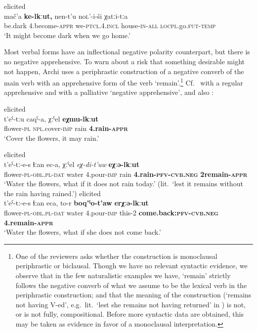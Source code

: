 \documentclass[output=paper,colorlinks,citecolor=brown]{langscibook}
\begin{document}
  \begin{exe}\ex \label{ex:DD8} \textnormal{elicited}\\
{\gll mač'a \textbf{ke-lkːut,} nen-t'u no\textsc{l}'-i-ši χatːi-tːa\\
be.dark 4.become-\textsc{appr} we-\textsc{ptcl.4.incl} house-\textsc{in-all} \textsc{locpl}.go.\textsc{fut-temp}\\\glt `It might become dark when we go home.'}
\end{exe}


 Most verbal forms have an inflectional negative polarity counterpart, but there is no negative apprehensive. To warn about a risk that something desirable might not happen, Archi uses a periphrastic construction of a negative converb of the main verb with an apprehensive form of the verb `remain'.\footnote{One of the reviewers asks whether the construction is monoclausal periphrastic or biclausal. Though we have no relevant syntactic evidence, we observe that in the few naturalistic examples we have, `remain' strictly follows the negative converb of what we assume to be the lexical verb in the periphrastic construction; and that the meaning of the construction (`remains not having V-ed', e.g.\  lit.\ `lest she remains not having returned' in ) is not, or is not fully, compositional. Before more syntactic data are obtained, this may be taken as evidence in favor of a monoclausal interpretation.} Cf.\  with a regular apprehensive and  with a palliative `negative apprehensive', and also :

\ea \label{ex:DD9} \textnormal{elicited} \\
\gll t'eˁ-tːu caqˁ-a, χːˁel \textbf{eχmu-lkːut} \\
flower-\textsc{pl} \textsc{npl}.cover-\textsc{imp} rain \textbf{4.rain-\textsc{appr}} \\
\glt `Cover the flowers, it may rain.'
\z


\ea \label{ex:DD10} \textnormal{elicited} \\
\gll t'eˁ-tː-e-s ɬːan ec-a, χːˁel \textit{eχ-di-t'uw} \textbf{eχːə-lkːut} \\
flower-\textsc{pl-obl.pl-dat} water 4.pour-\textsc{imp} rain \textbf{4.rain-\textsc{pfv-cvb.neg}} \textbf{{\textlangle}2{\textrangle}remain-\textsc{appr}} \\
\glt `Water the flowers, what if it does not rain today.' (lit.\ `lest it remains without the rain having rained.')
\z
\ea \label{ex:DD11} \textnormal{elicited} \\
\gll t'eˁ-tː-e-s ɬːan eca, to-r \textbf{boq'ˁo-t'aw} \textbf{e{\textlangle}r{\textrangle}χːə-lkːut}\\
flower-\textsc{pl-obl.pl-dat} water 4.pour-\textsc{imp} this-2 \textbf{come.back:\textsc{pfv-cvb.neg}} \textbf{4.remain-\textsc{appr}}\\
\glt `Water the flowers, what if she does not come back.'
\z 
\end{document}
